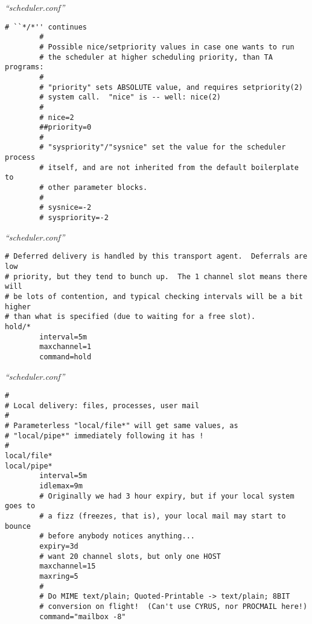 \documentclass[a4paper,landscape]{slides}
\begin{document}
\begin{overlay}
\small
\centerline{{\it ``scheduler.conf''}}
\tiny
\begin{verbatim}
# ``*/*'' continues
        #
        # Possible nice/setpriority values in case one wants to run
        # the scheduler at higher scheduling priority, than TA programs:
        #
        # "priority" sets ABSOLUTE value, and requires setpriority(2)
        # system call.  "nice" is -- well: nice(2)
        #
        # nice=2
        ##priority=0
        #
        # "syspriority"/"sysnice" set the value for the scheduler process
        # itself, and are not inherited from the default boilerplate to
        # other parameter blocks.
        #
        # sysnice=-2
        # syspriority=-2
\end{verbatim}
\vfill
\end{overlay}
\begin{overlay}
\small
\centerline{{\it ``scheduler.conf''}}
\tiny
\begin{verbatim}
# Deferred delivery is handled by this transport agent.  Deferrals are low
# priority, but they tend to bunch up.  The 1 channel slot means there will
# be lots of contention, and typical checking intervals will be a bit higher
# than what is specified (due to waiting for a free slot).
hold/*
        interval=5m
        maxchannel=1
        command=hold
\end{verbatim}
\vfill
\end{overlay}
\begin{overlay}
\small
\centerline{{\it ``scheduler.conf''}}
\tiny
\begin{verbatim}
#
# Local delivery: files, processes, user mail
#
# Parameterless "local/file*" will get same values, as
# "local/pipe*" immediately following it has !
#
local/file*
local/pipe*
        interval=5m
        idlemax=9m
        # Originally we had 3 hour expiry, but if your local system goes to
        # a fizz (freezes, that is), your local mail may start to bounce
        # before anybody notices anything...
        expiry=3d
        # want 20 channel slots, but only one HOST
        maxchannel=15
        maxring=5
        #
        # Do MIME text/plain; Quoted-Printable -> text/plain; 8BIT
        # conversion on flight!  (Can't use CYRUS, nor PROCMAIL here!)
        command="mailbox -8"
\end{verbatim}
\vfill
\end{overlay}
\end{document}
